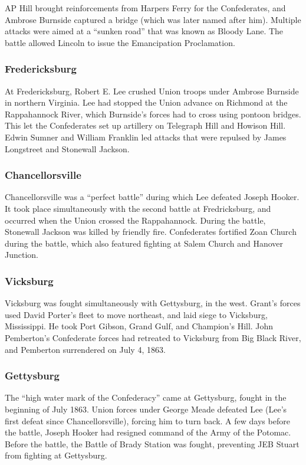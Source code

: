 AP Hill brought reinforcements from Harpers Ferry for the Confederates,
and Ambrose Burnside captured a bridge (which was later named after him).
Multiple attacks were aimed at a ``sunken road'' that was known as Bloody Lane.
The battle allowed Lincoln to issue the Emancipation Proclamation.

\subsubsection*{Fredericksburg}

At Fredericksburg, Robert E. Lee crushed Union troops under Ambrose Burnside in northern Virginia.
Lee had stopped the Union advance on Richmond at the Rappahannock River,
which Burnside's forces had to cross using pontoon bridges.
This let the Confederates set up artillery on Telegraph Hill and Howison Hill.
Edwin Sumner and William Franklin led attacks that were repulsed by James Longstreet and Stonewall Jackson.

\subsubsection*{Chancellorsville}

Chancellorsville was a ``perfect battle'' during which Lee defeated Joseph Hooker.
It took place simultaneously with the second battle at Fredricksburg,
and occurred when the Union crossed the Rappahannock.
During the battle, Stonewall Jackson was killed by friendly fire.
Confederates fortified Zoan Church during the battle,
which also featured fighting at Salem Church and Hanover Junction.

\subsubsection*{Vicksburg}

Vicksburg was fought simultaneously with Gettysburg, in the west.
Grant's forces used David Porter's fleet to move northeast, and laid siege to Vicksburg, Mississippi.
He took Port Gibson, Grand Gulf, and Champion's Hill.
John Pemberton's Confederate forces had retreated to Vicksburg from Big Black River,
and Pemberton surrendered on July 4, 1863.

\subsubsection*{Gettysburg}

The ``high water mark of the Confederacy'' came at Gettysburg, fought in the beginning of July 1863.
Union forces under George Meade defeated Lee (Lee's first defeat since Chancellorsville), forcing him to turn back.
A few days before the battle, Joseph Hooker had resigned command of the Army of the Potomac.
Before the battle, the Battle of Brady Station was fought, preventing JEB Stuart from fighting at Gettysburg.

